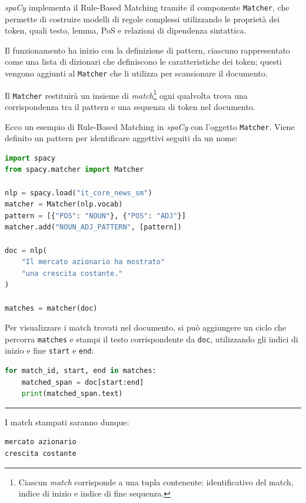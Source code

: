 \documentclass[12pt]{report}
\newcommand{\spacy}{\textsl{spaCy}\xspace}
\begin{document}
\spacy implementa il Rule-Based Matching tramite il componente \texttt{Matcher}, che permette di costruire modelli di regole complessi utilizzando le proprietà dei token, quali testo, lemma, PoS e relazioni di dipendenza sintattica.

Il funzionamento ha inizio con la definizione di pattern, ciascuno rappresentato come una lista di dizionari che definiscono le caratteristiche dei token; questi vengono aggiunti al \texttt{Matcher} che li utilizza per scansionare il documento.

Il \texttt{Matcher} restituirà un insieme di \textit{match}\footnote{Ciascun \textit{match} corrisponde a una tupla contenente: identificativo del match, indice di inizio e indice di fine sequenza.} ogni qualvolta trova una corrispondenza tra il pattern e una sequenza di token nel documento.

\begin{mdframed}
\small
Ecco un esempio di Rule-Based Matching in \spacy con l'oggetto \texttt{Matcher}. Viene definito un pattern per identificare aggettivi seguiti da un nome:

\begin{lstlisting}[language=Python]
import spacy
from spacy.matcher import Matcher

nlp = spacy.load("it_core_news_sm")
matcher = Matcher(nlp.vocab)
pattern = [{"POS": "NOUN"}, {"POS": "ADJ"}]
matcher.add("NOUN_ADJ_PATTERN", [pattern])

doc = nlp(
    "Il mercato azionario ha mostrato"
    "una crescita costante."
)

matches = matcher(doc)
\end{lstlisting}
\end{mdframed}


\begin{mdframed}
\small
Per visualizzare i match trovati nel documento, si può aggiungere un ciclo che percorra \texttt{matches} e stampi il testo corrispondente da \texttt{doc}, utilizzando gli indici di inizio e fine \texttt{start} e \texttt{end}:

\begin{lstlisting}[language=Python]
for match_id, start, end in matches:
    matched_span = doc[start:end]
    print(matched_span.text)
\end{lstlisting}

{\centering \rule{0.5\linewidth}{0.1pt} \par\vspace{0.25cm}}

\noindent I match stampati saranno dunque:

\begin{lstlisting}
mercato azionario
crescita costante
\end{lstlisting}
\end{mdframed}
\end{document}
